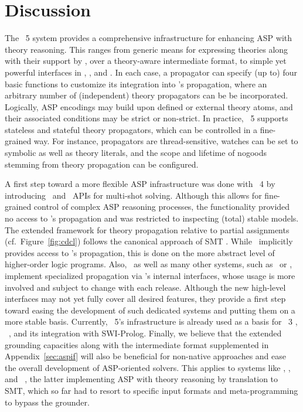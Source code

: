 
\section{Discussion}\label{sec:discussion}

The \clingo~5 system provides a comprehensive infrastructure for enhancing ASP with theory reasoning.
This ranges from
generic means for expressing theories along with their support by \gringo,
over a theory-aware intermediate format,
to simple yet powerful interfaces in \C, \lua, and \python.
In each case, a propagator can    specify (up to) four basic functions to customize its integration into \clasp's propagation,
where an arbitrary number of (independent) theory propagators can be be incorporated.
Logically, ASP encodings may build upon defined or external theory atoms,
and their associated conditions may be strict or non-strict.
In practice,
\clingo~5 supports stateless and stateful theory propagators, which can be controlled in a fine-grained way.
%
For instance, propagators are thread-sensitive, watches can be set to symbolic as well as theory literals,
and the scope and lifetime of nogoods stemming from theory propagation can be configured.

A first step toward a more flexible ASP infrastructure
was done with \clingo~4 \cite{gekakasc14b} by introducing \lua\ and \python\ APIs for multi-shot solving.
Although this allows for fine-grained control of complex ASP reasoning processes,
the functionality provided no access to \clasp's propagation and was restricted to inspecting (total) stable models.
%
The extended framework for theory propagation relative to partial assignments (cf.\ Figure~\ref{fig:cdcl})
follows the canonical approach of SMT \cite{baseseti09a}.
%
While \dlvhex\ implicitly provides access to \clasp's propagation,
this is done on the more abstract level of higher-order logic programs.
Also, \dlvhex\ as well as many other systems, such as \clingcon\ or \inca,
implement specialized propagation via \clasp's internal interfaces,
whose usage is more involved and subject to change with each release.
%
Although the new high-level interfaces may not yet fully cover all desired features,
they provide a first step toward easing the development of such dedicated systems and
putting them on a more stable basis.
%
Currently,
\clingo~5's infrastructure is already used as a basis for
\clingcon~3 \cite{bakakaossc16a},
\lctocasp\ \cite{cakaossc16a},
and
its integration with SWI-Prolog.
%
Finally, we believe that the extended grounding capacities along with the intermediate format supplemented in Appendix~\ref{sec:aspif}  %
will also be beneficial for non-native approaches and ease the overall development of ASP-oriented solvers.
This applies to systems like \dingo, \mingo, and \aspmt\ \cite{barlee14b},
the latter implementing ASP with theory reasoning by translation to SMT,
which so far had to resort to specific input formats and meta-programming to bypass the grounder.

